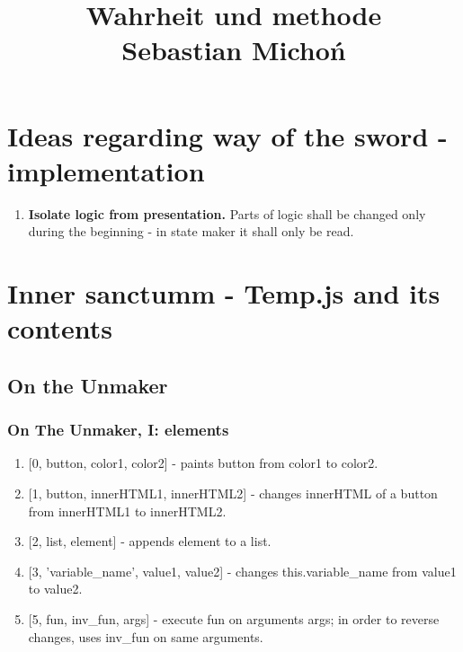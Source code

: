 \documentclass[12pt]{article}
\begin{document}
\title{Wahrheit und methode\\
\large Sebastian Michoń}
\date{\vspace{-10ex}}
\maketitle

\section {Ideas regarding way of the sword - implementation}
\begin{enumerate}
	\item \textbf{Isolate logic from presentation.} Parts of logic shall be changed only during the beginning - in state maker it shall only be read.
\end{enumerate}
\section {Inner sanctumm - Temp.js and its contents}
\subsection {On the Unmaker}
\subsubsection{On The Unmaker, I: elements}
\begin {enumerate}
	\item {[0, button, color1, color2]} - paints button from color1 to color2.
	\item {[1, button, innerHTML1, innerHTML2]} - changes innerHTML of a button from innerHTML1 to innerHTML2.
	\item {[2, list, element]} - appends element to a list.
	\item {[3, 'variable\_name', value1, value2]} - changes this.variable\_name from value1 to value2.
	\item {[5, fun, inv\_fun, args]} - execute fun on arguments args; in order to reverse changes, uses inv\_fun on same arguments.
\end{enumerate}
\end{document}
